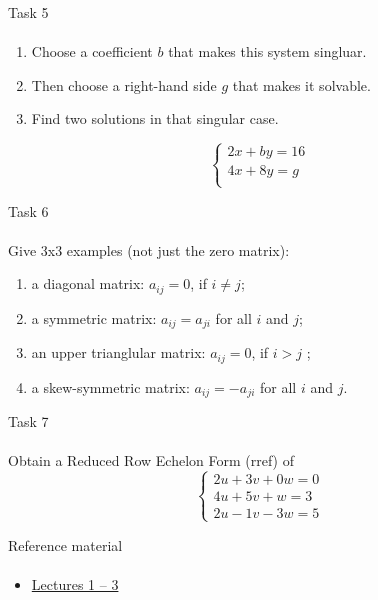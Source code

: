 \documentclass[aspectratio=169]{beamer}
\begin{document}
\begin{frame}[t]{Task 5}
\framesubtitle{}
    \begin{enumerate}
        \item Choose a coefficient $b$ that makes this system singluar.
        \item Then choose a right-hand side $g$ that makes it solvable.
        \item Find two solutions in that singular case.
    \end{enumerate}
    \begin{equation*}
        \left\{\begin{matrix}
            2x + by = 16 \\ 
            4x + 8y = g \\ 
            \end{matrix}\right.
        \end{equation*}
\end{frame}

\begin{frame}[t]{Task 6}
\framesubtitle{}
    Give 3x3 examples (not just the zero matrix):
    \begin{enumerate}
        \item a diagonal matrix: $a_{ij}=0$, if $i \neq j$;
        \item a symmetric matrix: $a_{ij} = a_{ji}$ for all $i$ and $j$;
        \item an upper trianglular matrix: $a_{ij}=0$, if $i>j$ ;
        \item a skew-symmetric matrix: $a_{ij} = -a_{ji}$ for all $i$ and $j$.
    \end{enumerate}
\end{frame}

\begin{frame}[t]{Task 7}
\framesubtitle{}
    Obtain a Reduced Row Echelon Form (rref) of
    \begin{equation*}
        \left\{\begin{matrix}
            2u + 3v + 0w = 0 \\ 
            4u + 5v + w = 3 \\ 
            2u - 1v - 3w = 5 
            \end{matrix}\right.
        \end{equation*}
\end{frame}

\begin{frame}[t]{Reference material}
\framesubtitle{}
\Large
    \begin{itemize}
        \item \href{https://ocw.mit.edu/courses/mathematics/18-06-linear-algebra-spring-2010/video-lectures/}{Lectures 1 -- 3}
    \end{itemize}
\end{frame}
\end{document}
